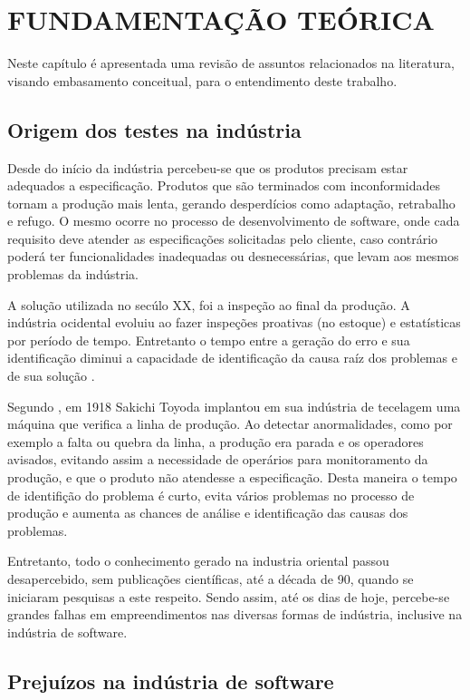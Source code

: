 \chapter{FUNDAMENTAÇÃO TEÓRICA}

Neste capítulo é apresentada uma revisão de assuntos relacionados na literatura, visando embasamento conceitual, para o entendimento deste trabalho.

\section{Origem dos testes na indústria}

Desde do início da indústria percebeu-se que os produtos precisam estar adequados a especificação. Produtos que são terminados com inconformidades tornam a produção mais lenta, gerando desperdícios como adaptação, retrabalho e refugo. O mesmo ocorre no processo de desenvolvimento de software, onde cada requisito deve atender as especificações solicitadas pelo cliente, caso contrário poderá ter funcionalidades inadequadas ou desnecessárias, que levam aos mesmos problemas da indústria.

A solução utilizada no secúlo XX, foi a inspeção ao final da produção. A indústria ocidental evoluiu ao fazer inspeções proativas (no estoque) e estatísticas por período de tempo. Entretanto o tempo entre a geração do erro e sua identificação diminui a capacidade de identificação da causa raíz dos problemas e de sua solução \cite{CARVALHO}.

Segundo , em 1918 Sakichi Toyoda implantou em sua indústria de tecelagem uma máquina que verifica a linha de produção. Ao detectar anormalidades, como por exemplo a falta ou quebra da linha, a produção era parada e os operadores avisados, evitando assim a necessidade de operários para monitoramento da produção, e que o produto não atendesse a especificação. Desta maneira o tempo de identifição do problema é curto, evita vários problemas no processo de produção e aumenta as chances de análise e identificação das causas dos problemas.

Entretanto, todo o conhecimento gerado na industria oriental passou desapercebido, sem publicações científicas, até a década de 90, quando se iniciaram pesquisas a este respeito. Sendo assim, até os dias de hoje, percebe-se grandes falhas em empreendimentos nas diversas formas de indústria, inclusive na indústria de software.

\section{Prejuízos na indústria de software}

